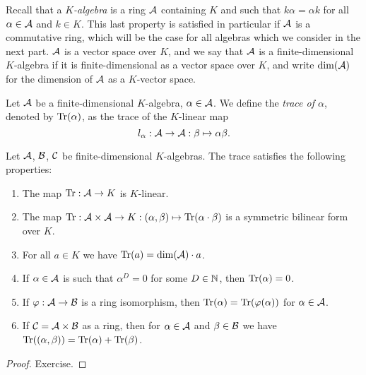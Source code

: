 \documentclass[12pt, leqno, british]{amsart}
\begin{document}
Recall that a \emph{$K$-algebra} is a ring $\mathcal{A}$ containing $K$ and such that $k\alpha = \alpha k$ for all $\alpha \in \mathcal{A}$ and $k \in K$.
This last property is satisfied in particular if $\mathcal{A}$ is a commutative ring, which will be the case for all algebras which we consider in the next part.
$\mathcal{A}$ is a vector space over $K$, and we say that $\mathcal{A}$ is a finite-dimensional $K$-algebra if it is finite-dimensional as a vector space over $K$, and write $\dim(\mathcal{A})$ for the dimension of $\mathcal{A}$ as a $K$-vector space.
\begin{defi}\label{D:trace}
Let $\mathcal{A}$ be a finite-dimensional $K$-algebra, $\alpha \in \mathcal{A}$.
We define the \emph{trace of $\alpha$}, denoted by $\operatorname{Tr}(\alpha)$, as the trace of the $K$-linear map
$$ l_\alpha : \mathcal{A} \to \mathcal{A} : \beta \mapsto \alpha \beta.$$
\end{defi}
\begin{prop}\label{P:trace-properties}
Let $\mathcal{A}$, $\mathcal{B}$, $\mathcal{C}$ be finite-dimensional $K$-algebras.
The trace satisfies the following properties:
\begin{enumerate}
\item The map $\operatorname{Tr} : \mathcal{A} \to K$ is $K$-linear.
\item\label{it:trace-symmbil} The map $\operatorname{Tr} : \mathcal{A} \times \mathcal{A} \to K : (\alpha, \beta) \mapsto \operatorname{Tr}(\alpha \cdot \beta)$ is a symmetric bilinear form over $K$.
\item For all $a \in K$ we have $\operatorname{Tr}(a) = \dim(\mathcal{A}) \cdot a$.
\item\label{it:trace-zero-divisor} If $\alpha \in \mathcal{A}$ is such that $\alpha^D = 0$ for some $D \in \mathbb N$, then $\operatorname{Tr}(\alpha) = 0$.
\item If $\varphi : \mathcal{A} \to \mathcal{B}$ is a ring isomorphism, then $\operatorname{Tr}(\alpha) = \operatorname{Tr}(\varphi(\alpha))$ for $\alpha \in \mathcal{A}$.
\item If $\mathcal{C} = \mathcal{A} \times \mathcal{B}$ as a ring, then for $\alpha \in \mathcal{A}$ and $\beta \in \mathcal{B}$ we have $\operatorname{Tr}((\alpha, \beta)) = \operatorname{Tr}(\alpha) + \operatorname{Tr}(\beta)$.
\end{enumerate}
\end{prop}
\begin{proof}
Exercise.
\end{proof}
\end{document}
